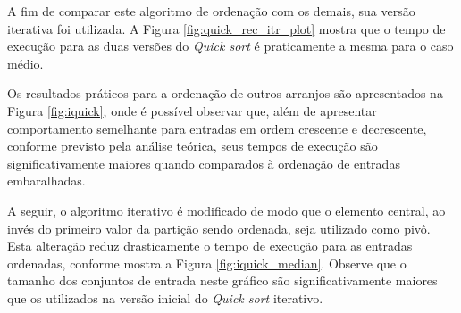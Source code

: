 \documentclass[12pt]{article}
\begin{document}
A fim de comparar este algoritmo de ordenação com os demais, sua versão iterativa foi utilizada. A Figura \ref{fig:quick_rec_itr_plot} mostra que o tempo de execução para as duas versões do \textit{Quick sort} é praticamente a mesma para o caso médio.

Os resultados práticos para a ordenação de outros arranjos são apresentados na Figura \ref{fig:iquick}, onde é possível observar que, além de  apresentar comportamento semelhante para entradas em ordem crescente e decrescente, conforme previsto pela análise teórica, seus tempos de execução são significativamente maiores quando comparados à ordenação de entradas embaralhadas.

A seguir, o algoritmo iterativo é modificado de modo que o elemento central, ao invés do primeiro valor da partição sendo ordenada, seja utilizado como pivô. Esta alteração reduz drasticamente o tempo de execução para as entradas ordenadas, conforme mostra a Figura \ref{fig:iquick_median}. Observe que o tamanho dos conjuntos de entrada neste gráfico são significativamente maiores que os utilizados na versão inicial do \textit{Quick sort} iterativo.
\end{document}
